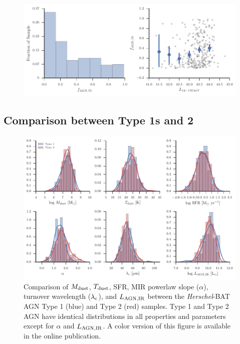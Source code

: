 \documentclass[fleqn, usenatbib]{mnras}
\newcommand{\herschel}{\emph{Herschel}}
\begin{document}
\begin{figure}
\includegraphics{figures/pacs_AGN_contribution}
\caption{\label{fig:70um_agn_contribution}}
\end{figure}


\subsection{Comparison between Type 1s and 2}

\begin{figure}
\includegraphics[width=\textwidth]{figures/agn_type_comparison}
\caption{Comparison of $M_{\rm dust}$, $T_{\rm dust}$, SFR, MIR powerlaw slope ($\alpha$), turnover wavelength ($\lambda_{\rm c}$), and $L_{\rm AGN,IR}$ between the \herschel-BAT AGN Type 1 (blue) and Type 2 (red) samples. Type 1 and Type 2 AGN have identical distributions in all properties and parameters except for $\alpha$ and $L_{\rm AGN,IR}$. A color version of this figure is available in the online publication. \label{fig:agn_type_comp}}
\end{figure}
\end{document}
